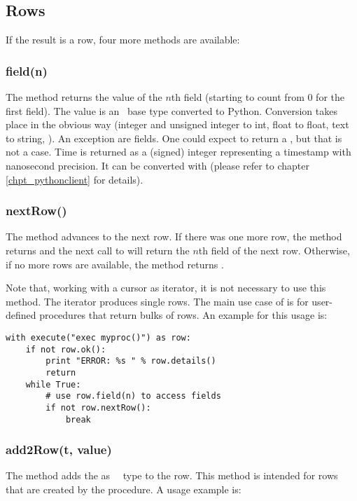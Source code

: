 \subsection{Rows}
If the result is a row,
four more methods are available:

\subsubsection{field(n)}
The method returns the value
of the $n$th field (starting to count
from 0 for the first field).
The value is an \sql\ base type
converted to Python.
Conversion takes place in the obvious way
(integer and unsigned integer to int,
 float to float, text to string, \etc).
An exception are  fields.
One could expect  to return
a , but that is not a case.
Time is returned as a (signed) integer
representing a  timestamp
with nanosecond precision.
It can be converted with 
(please refer to chapter \ref{chpt_pythonclient}
for details).

\subsubsection{nextRow()}
The method advances to the next row.
If there was one more row, the method
returns  and the next call
to  will return the
$n$th field of the next row.
Otherwise, if no more rows are available,
the method returns .

Note that, working with a cursor
as iterator, it is not necessary
to use this method. The iterator
produces single rows.
The main use case of 
is for user-defined procedures that
return bulks of rows. An example
for this usage is:

\begin{python}
\begin{lstlisting}
with execute("exec myproc()") as row:
    if not row.ok():
        print "ERROR: %s " % row.details()
        return
    while True:
        # use row.field(n) to access fields
        if not row.nextRow():
            break
\end{lstlisting}
\end{python}

\subsubsection{add2Row(t, value)}
The method adds the 
as \nowdb\ \sql\ type  to
the row. This method is intended
for rows that are created by the
procedure. A usage example is:

